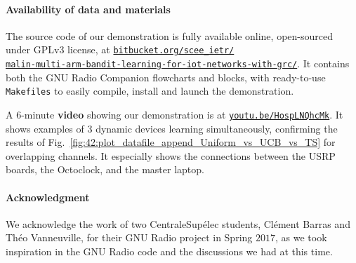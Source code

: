 \paragraph{Availability of data and materials}
%
The source code of our demonstration is fully available online, open-sourced under GPLv3 license, at
\href{https://bitbucket.org/scee_ietr/malin-multi-arm-bandit-learning-for-iot-networks-with-grc}{\texttt{bitbucket.org/scee\_ietr/\\malin-multi-arm-bandit-learning-for-iot-networks-with-grc/}}.
It contains both the GNU Radio Companion flowcharts and blocks, with ready-to-use \texttt{Makefiles} to easily compile, install and launch the demonstration.

A $6$-minute \textbf{video} showing our demonstration is at \texttt{\url{youtu.be/HospLNQhcMk}}.
It shows examples of $3$ dynamic devices learning simultaneously, confirming the results of Fig.~\ref{fig:42:plot_datafile_append_Uniform_vs_UCB_vs_TS} for overlapping channels.
It especially shows the connections between the USRP boards, the Octoclock, and the master laptop.

\paragraph{Acknowledgment}
%
We acknowledge the work of two CentraleSup{\'e}lec students,
Cl{\'e}ment Barras and Th{\'e}o Vanneuville, for their GNU Radio project in Spring $2017$,
as we took inspiration in the GNU Radio code and the discussions we had at this time.

